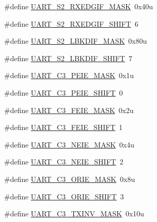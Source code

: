 \begin{DoxyCompactItemize}
\#define \hyperlink{group___u_a_r_t___register___masks_ga17b9dd16869c5185f2be9c1394fcede5}{U\+A\+R\+T\+\_\+\+S2\+\_\+\+R\+X\+E\+D\+G\+I\+F\+\_\+\+M\+A\+SK}~0x40u
\item 
\#define \hyperlink{group___u_a_r_t___register___masks_gab5a85582d800238efb298c45e578a83e}{U\+A\+R\+T\+\_\+\+S2\+\_\+\+R\+X\+E\+D\+G\+I\+F\+\_\+\+S\+H\+I\+FT}~6
\item 
\#define \hyperlink{group___u_a_r_t___register___masks_ga874d96e3755d584279e6f058522c2c4a}{U\+A\+R\+T\+\_\+\+S2\+\_\+\+L\+B\+K\+D\+I\+F\+\_\+\+M\+A\+SK}~0x80u
\item 
\#define \hyperlink{group___u_a_r_t___register___masks_ga42b99a34daa824eb7a8c8dd635ee4a4f}{U\+A\+R\+T\+\_\+\+S2\+\_\+\+L\+B\+K\+D\+I\+F\+\_\+\+S\+H\+I\+FT}~7
\item 
\#define \hyperlink{group___u_a_r_t___register___masks_gadf1ad2301848b5812b84658d02cc2006}{U\+A\+R\+T\+\_\+\+C3\+\_\+\+P\+E\+I\+E\+\_\+\+M\+A\+SK}~0x1u
\item 
\#define \hyperlink{group___u_a_r_t___register___masks_gad14f9faaee56b818a04794694960fa6a}{U\+A\+R\+T\+\_\+\+C3\+\_\+\+P\+E\+I\+E\+\_\+\+S\+H\+I\+FT}~0
\item 
\#define \hyperlink{group___u_a_r_t___register___masks_gaf165d0ae5fd464a2ec367e29d1dedcb2}{U\+A\+R\+T\+\_\+\+C3\+\_\+\+F\+E\+I\+E\+\_\+\+M\+A\+SK}~0x2u
\item 
\#define \hyperlink{group___u_a_r_t___register___masks_gac08e14a1c915cfa377176fc6d491e38d}{U\+A\+R\+T\+\_\+\+C3\+\_\+\+F\+E\+I\+E\+\_\+\+S\+H\+I\+FT}~1
\item 
\#define \hyperlink{group___u_a_r_t___register___masks_ga1e485aea10f0176919ae060d0ee1d709}{U\+A\+R\+T\+\_\+\+C3\+\_\+\+N\+E\+I\+E\+\_\+\+M\+A\+SK}~0x4u
\item 
\#define \hyperlink{group___u_a_r_t___register___masks_gae70ab8b995df889314915948d51ae783}{U\+A\+R\+T\+\_\+\+C3\+\_\+\+N\+E\+I\+E\+\_\+\+S\+H\+I\+FT}~2
\item 
\#define \hyperlink{group___u_a_r_t___register___masks_ga85999d87eca30c526580b0d060f2aff5}{U\+A\+R\+T\+\_\+\+C3\+\_\+\+O\+R\+I\+E\+\_\+\+M\+A\+SK}~0x8u
\item 
\#define \hyperlink{group___u_a_r_t___register___masks_ga3e65d9370ba1e2d05042db7ed72e599b}{U\+A\+R\+T\+\_\+\+C3\+\_\+\+O\+R\+I\+E\+\_\+\+S\+H\+I\+FT}~3
\item 
\#define \hyperlink{group___u_a_r_t___register___masks_ga6c9c90706e66f4bfa8fb53dd0407e579}{U\+A\+R\+T\+\_\+\+C3\+\_\+\+T\+X\+I\+N\+V\+\_\+\+M\+A\+SK}~0x10u
\item 

\end{DoxyCompactItemize}
